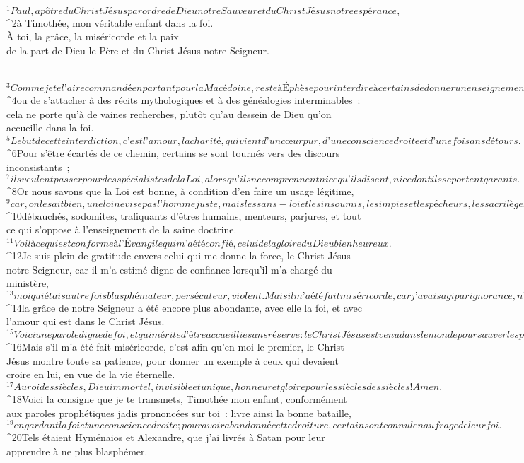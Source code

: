   
  
    
      
         
      \bchapter{}
        ${}^{1}Paul, apôtre du Christ Jésus
        par ordre de Dieu notre Sauveur
        et du Christ Jésus notre espérance,
        ${}^{2}à Timothée,
        mon véritable enfant dans la foi.
        \\À toi, la grâce, la miséricorde et la paix
        \\de la part de Dieu le Père
        et du Christ Jésus notre Seigneur.
        
           
${}^{3}Comme je te l’ai recommandé en partant pour la Macédoine, reste à Éphèse pour interdire à certains de donner un enseignement différent 
${}^{4}ou de s’attacher à des récits mythologiques et à des généalogies interminables : cela ne porte qu’à de vaines recherches, plutôt qu’au dessein de Dieu qu’on accueille dans la foi. 
${}^{5}Le but de cette interdiction, c’est l’amour, la charité, qui vient d’un cœur pur, d’une conscience droite et d’une foi sans détours. 
${}^{6}Pour s’être écartés de ce chemin, certains se sont tournés vers des discours inconsistants ; 
${}^{7}ils veulent passer pour des spécialistes de la Loi, alors qu’ils ne comprennent ni ce qu’ils disent, ni ce dont ils se portent garants. 
${}^{8}Or nous savons que la Loi est bonne, à condition d’en faire un usage légitime, 
${}^{9}car, on le sait bien, une loi ne vise pas l’homme juste, mais les sans-loi et les insoumis, les impies et les pécheurs, les sacrilèges et les profanateurs, les parricides et matricides, et autres meurtriers, 
${}^{10}débauchés, sodomites, trafiquants d’êtres humains, menteurs, parjures, et tout ce qui s’oppose à l’enseignement de la saine doctrine. 
${}^{11}Voilà ce qui est conforme à l’Évangile qui m’a été confié, celui de la gloire du Dieu bienheureux.
${}^{12}Je suis plein de gratitude envers celui qui me donne la force, le Christ Jésus notre Seigneur, car il m’a estimé digne de confiance lorsqu’il m’a chargé du ministère, 
${}^{13}moi qui étais autrefois blasphémateur, persécuteur, violent. Mais il m’a été fait miséricorde, car j’avais agi par ignorance, n’ayant pas encore la foi ; 
${}^{14}la grâce de notre Seigneur a été encore plus abondante, avec elle la foi, et avec l’amour qui est dans le Christ Jésus. 
${}^{15}Voici une parole digne de foi, et qui mérite d’être accueillie sans réserve : le Christ Jésus est venu dans le monde pour sauver les pécheurs ; et moi, je suis le premier des pécheurs. 
${}^{16}Mais s’il m’a été fait miséricorde, c’est afin qu’en moi le premier, le Christ Jésus montre toute sa patience, pour donner un exemple à ceux qui devaient croire en lui, en vue de la vie éternelle. 
${}^{17}Au roi des siècles, Dieu immortel, invisible et unique, honneur et gloire pour les siècles des siècles ! Amen.
${}^{18}Voici la consigne que je te transmets, Timothée mon enfant, conformément aux paroles prophétiques jadis prononcées sur toi : livre ainsi la bonne bataille, 
${}^{19}en gardant la foi et une conscience droite ; pour avoir abandonné cette droiture, certains ont connu le naufrage de leur foi. 
${}^{20}Tels étaient Hyménaios et Alexandre, que j’ai livrés à Satan pour leur apprendre à ne plus blasphémer.
      
